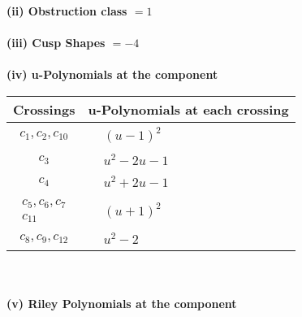 \documentclass[1p]{elsarticle_modified}
\theoremstyle{definition}
\begin{document}
\flushleft \textbf{(ii) Obstruction class $= 1$}\\~\\
\flushleft \textbf{(iii) Cusp Shapes $= -4$}\\~\\
\newpage\renewcommand{\arraystretch}{1}
\flushleft \textbf{(iv) u-Polynomials at the component}\newline \\
\begin{tabular}{m{50pt}|m{274pt}}
Crossings & \hspace{64pt}u-Polynomials at each crossing \\
\hline $$\begin{aligned}c_{1},c_{2},c_{10}\end{aligned}$$&$\begin{aligned}
&(u-1)^2
\end{aligned}$\\
\hline $$\begin{aligned}c_{3}\end{aligned}$$&$\begin{aligned}
&u^2-2 u-1
\end{aligned}$\\
\hline $$\begin{aligned}c_{4}\end{aligned}$$&$\begin{aligned}
&u^2+2 u-1
\end{aligned}$\\
\hline $$\begin{aligned}c_{5},c_{6},c_{7}\\c_{11}\end{aligned}$$&$\begin{aligned}
&(u+1)^2
\end{aligned}$\\
\hline $$\begin{aligned}c_{8},c_{9},c_{12}\end{aligned}$$&$\begin{aligned}
&u^2-2
\end{aligned}$\\
\hline
\end{tabular}\\~\\
\newpage\renewcommand{\arraystretch}{1}
\flushleft \textbf{(v) Riley Polynomials at the component}\newline \\
\end{document}
